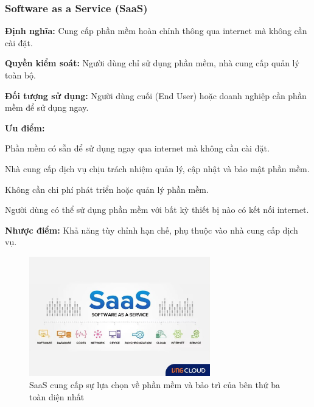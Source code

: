 \subsubsection{Software as a Service (SaaS)}
\begin{myitem}
  \item \textbf{Định nghĩa:} Cung cấp phần mềm hoàn chỉnh thông qua internet mà không cần cài đặt.

  \item \textbf{Quyền kiểm soát:} Người dùng chỉ sử dụng phần mềm, nhà cung cấp quản lý toàn bộ.

  \item \textbf{Đối tượng sử dụng:} Người dùng cuối (End User) hoặc doanh nghiệp cần phần mềm để sử dụng ngay.

  \item \textbf{Ưu điểm:}
    \begin{mysubitem}
      \item Phần mềm có sẵn để sử dụng ngay qua internet mà không cần cài đặt.
      \item Nhà cung cấp dịch vụ chịu trách nhiệm quản lý, cập nhật và bảo mật phần mềm.
      \item Không cần chi phí phát triển hoặc quản lý phần mềm.
      \item Người dùng có thể sử dụng phần mềm với bất kỳ thiết bị nào có kết nối internet.
    \end{mysubitem}

  \item \textbf{Nhược điểm:} Khả năng tùy chỉnh hạn chế, phụ thuộc vào nhà cung cấp dịch vụ.
\end{myitem}

\begin{figure}[H] %
    \centering
    \includegraphics[width=0.7\textwidth]{Tong_quan_DTDM/SaaS.jpg}
    \caption{SaaS cung cấp sự lựa chọn về phần mềm và bảo trì của bên thứ
ba toàn diện nhất}
    \label{fig:cloud_intro}
\end{figure}

